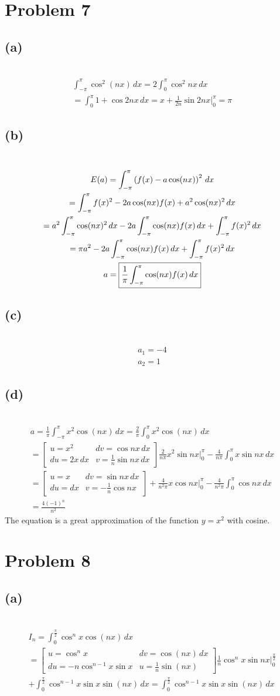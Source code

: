 \documentclass[12pt]{article}
\newcommand*{\paren}[1]{\ensuremath\left(#1\right)}
\newcommand{\problem}[1]{\section{Problem #1}}
\newcommand{\subproblem}[1]{\subsection{(#1)} \,}
\begin{document}
\problem{7}

\subproblem{a}
\begin{gather*}
    \int_{-\pi} ^\pi \cos^2 (nx)\, dx = 2 \int _0^\pi \cos^2 nx\, dx\\
    = \int_0^\pi 1+ \cos 2nx\, dx =x+ \frac{1}{2n} \sin 2nx\Big|^\pi_0 = \boxed{\pi}
\end{gather*}

\subproblem{b}
\begin{gather*}
    E(a)=\int_{-\pi}^\pi \paren{f(x)-a\cos(nx)}^2\, dx\\
    = \int_{-\pi}^\pi f(x)^2-2a\cos (nx)f(x)+a^2\cos(nx)^2 \, dx\\
    = a^2 \int_{-\pi}^\pi \cos(nx)^2 \, dx - 2a\int_{-\pi}^\pi \cos (nx)f(x)\, dx + \int_{-\pi}^\pi f(x)^2\, dx\\
    = \pi a^2  - 2a\int_{-\pi}^\pi \cos (nx)f(x)\, dx + \int_{-\pi}^\pi f(x)^2\, dx\\
    a= \boxed{\frac{1}{\pi} \int_{-\pi}^\pi \cos (nx)f(x)\, dx }
\end{gather*}

\subproblem{c}
\begin{gather*}
    a_1=\boxed{-4}\\
    a_2=\boxed{1}
\end{gather*}

\subproblem{d}
\begin{gather*}
    a=\frac{1}{\pi} \int_{-\pi}^\pi x^2\cos (nx)\, dx= \frac{2}{\pi} \int_{0}^\pi x^2\cos (nx)\, dx\\
    = \begin{bmatrix}
        u=x^2 & dv=\cos nx \, dx\\
        du =2x\, dx & v =\frac{1}{n}\sin nx \, dx
    \end{bmatrix}
    \frac{2}{n\pi} x^2\sin nx \Big|^\pi_0 - \frac{4}{n\pi} \int_0^\pi x \sin nx \, dx\\
    = \begin{bmatrix}
        u=x & dv=\sin nx\, dx\\
        du=dx & v= -\frac{1}{n} \cos nx
    \end{bmatrix}
    +\frac{4}{n^2\pi} x\cos nx \big|^\pi_0 - \frac{4}{n^2\pi} \int_0^\pi \cos nx\, dx\\
    = \boxed{\frac{4(-1)^n}{n^2} }
\end{gather*}
The equation is a great approximation of the function $y=x^2$ with cosine.

\problem{8}

\subproblem{a}
\begin{gather*}
    I_n= \int_0^{\frac{\pi}{2}} \cos^n x\cos (nx)\, dx\\
    =\begin{bmatrix}
        u=\cos^n x & dv=\cos (nx)\, dx\\
        du=-n\cos^{n-1}x\sin x  & u=\frac{1}{n}\sin (nx)
    \end{bmatrix} \frac{1}{n}\cos^n x\sin nx\Big|^\frac{\pi}{2}_0 \\
    + \int_0^\frac{\pi}{2} \cos ^{n-1}x\sin x \sin (nx)\, dx = \boxed{\int_0^\frac{\pi}{2} \cos ^{n-1}x\sin x \sin (nx)\, dx}
\end{gather*}
\end{document}
